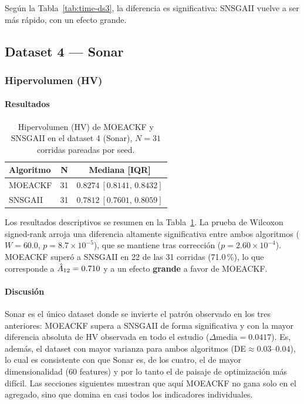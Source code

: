 Según la Tabla~\ref{tab:time-ds3}, la diferencia es significativa: SNSGAII vuelve a ser más
rápido, con un efecto grande.

\subsection{Dataset 4 --- Sonar}
\label{sec:ds4}

\subsubsection{Hipervolumen (HV)}
\label{sec:ds4-hv}

\paragraph{Resultados}

\begin{table}[htbp]
\centering
\small
\caption{Hipervolumen (HV) de MOEACKF y SNSGAII en el dataset 4 (Sonar), $N=31$ corridas
pareadas por seed.}
\label{tab:hv-ds4}
\begin{tabular}{@{}lcc@{}}
\toprule
\textbf{Algoritmo} & \textbf{N} & \textbf{Mediana [IQR]} \\
\midrule
MOEACKF & 31 & $0.8274\ [0.8141,\,0.8432]$ \\
SNSGAII & 31 & $0.7812\ [0.7601,\,0.8059]$ \\
\bottomrule
\end{tabular}
\end{table}

Los resultados descriptivos se resumen en la Tabla~\ref{tab:hv-ds4}. La prueba de Wilcoxon
signed-rank arroja una diferencia altamente significativa entre ambos algoritmos ($W=60.0$,
$p=8.7\times10^{-5}$), que se mantiene tras corrección ($p=2.60\times10^{-4}$). MOEACKF superó a
SNSGAII en 22 de las 31 corridas (71.0\,\%), lo que corresponde a $\hat{A}_{12}=0.710$ y a un efecto
\textbf{grande} a favor de MOEACKF.

\paragraph{Discusión}

Sonar es el único dataset donde se invierte el patrón observado en los tres anteriores: MOEACKF
supera a SNSGAII de forma significativa y con la mayor diferencia absoluta de HV observada en
todo el estudio ($\Delta\text{media}=0.0417$). Es, además, el dataset con mayor varianza para
ambos algoritmos (DE$\approx0.03$--$0.04$), lo cual es consistente con que Sonar es, de los
cuatro, el de mayor dimensionalidad (60 features) y por lo tanto el de paisaje de optimización
más difícil. Las secciones siguientes muestran que aquí MOEACKF no gana solo en el agregado,
sino que domina en casi todos los indicadores individuales.

